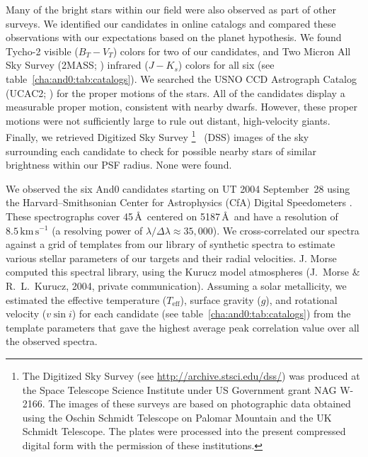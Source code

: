 Many of the bright stars within our field were also observed as part of other surveys. We identified our candidates in online catalogs and compared these observations with our expectations based on the planet hypothesis. We found Tycho-2 \citep{Hog_Fabricius_Makarov:aa:2000b, Hog_Fabricius_Makarov:aa:2000a} visible ($B_{T}-V_{T}$) colors for two of our candidates, and Two Micron All Sky Survey (2MASS; \citealt{Cutri_Skrutskie_van-Dyk:2003a}) infrared ($J-K_{s}$) colors for all six (see table~\ref{cha:and0:tab:catalogs}). We searched the USNO CCD Astrograph Catalog (UCAC2; \citealt{Zacharias_Urban_Zacharias:aj:2004a}) for the proper motions of the stars. All of the candidates display a measurable proper motion, consistent with nearby dwarfs. However, these proper motions were not sufficiently large to rule out distant, high-velocity giants. Finally, we retrieved Digitized Sky Survey%
\footnote{The {Digitized Sky Survey} (see \url{http://archive.stsci.edu/dss/}) was produced at the Space Telescope Science Institute under US Government grant NAG W-2166. The images of these surveys are based on photographic data obtained using the Oschin Schmidt Telescope on Palomar Mountain and the UK Schmidt Telescope. The plates were processed into the present compressed digital form with the permission of these institutions.}%
\ (DSS) images of the sky surrounding each candidate to check for possible nearby stars of similar brightness within our PSF radius. None were found.

We observed the six And0 candidates starting on UT 2004 September~28 using
the Harvard--Smithsonian Center for Astrophysics (CfA) Digital Speedometers \citep{Latham:ASP:1992a}. These spectrographs cover 45\,\AA\ centered on 5187\,\AA\, and have a resolution of $8.5\,\mathrm{km\,s^{-1}}$ (a resolving power of $\lambda / \Delta \lambda \approx 35,\!000$). We cross-correlated our spectra against a grid of templates from our library of synthetic spectra to estimate various stellar parameters of our targets and their radial velocities. J. Morse computed this spectral library, using the Kurucz model atmospheres (J.~Morse \& R.~L.~Kurucz, 2004, private communication).
Assuming a solar metallicity, we estimated the effective temperature ($T_{\mathrm{eff}}$), surface gravity ($g$), and rotational velocity ($v \sin{i}$) for each candidate (see table~\ref{cha:and0:tab:catalogs}) from the template parameters that gave the highest average peak correlation value over all the observed spectra.

